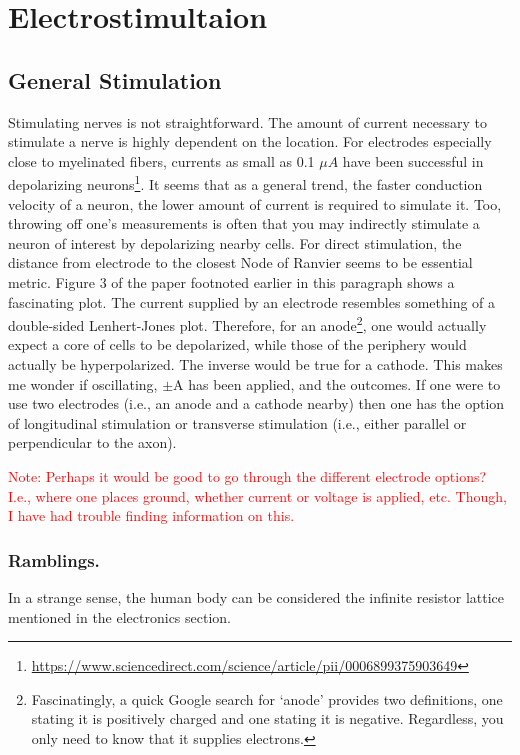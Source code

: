 \documentclass[12pt]{report}
\begin{document}
\section{Electrostimultaion}

\subsection{General Stimulation}
Stimulating nerves is not straightforward. The amount of current necessary to stimulate a nerve is highly dependent on the location. For electrodes especially close to myelinated fibers, currents as small as 0.1 $\mu A$ have been successful in depolarizing neurons\footnote{\url{https://www.sciencedirect.com/science/article/pii/0006899375903649}}. It seems that as a general trend, the faster conduction velocity of a neuron, the lower amount of current is required to simulate it. Too, throwing off one's measurements is often that you may indirectly stimulate a neuron of interest by depolarizing nearby cells. For direct stimulation, the distance from electrode to the closest Node of Ranvier seems to be essential metric. Figure 3 of the paper footnoted earlier in this paragraph shows a fascinating plot. The current supplied by an electrode resembles something of a double-sided Lenhert-Jones plot. Therefore, for an anode\footnote{Fascinatingly, a quick Google search for `anode' provides two definitions, one stating it is positively charged and one stating it is negative. Regardless, you only need to know that it supplies electrons.}, one would actually expect a core of cells to be depolarized, while those of the periphery would actually be hyperpolarized. The inverse would be true for a cathode. This makes me wonder if oscillating, $\pm$A has been applied, and the outcomes. If one were to use two electrodes (i.e., an anode and a cathode nearby) then one has the option of longitudinal stimulation or transverse stimulation (i.e., either parallel or perpendicular to the axon).\newline

\textcolor{red}{Note: Perhaps it would be good to go through the different electrode options? I.e., where one places ground, whether current or voltage is applied, etc. Though, I have had trouble finding information on this.}

\subsubsection{Ramblings.}
In a strange sense, the human body can be considered the infinite resistor lattice mentioned in the electronics section. 
\end{document}

